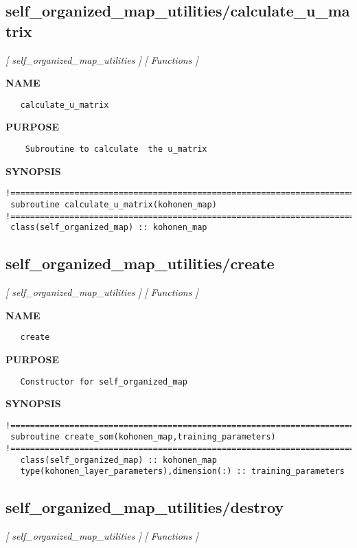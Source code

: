 \documentclass{article}
\begin{document}
\subsection{self\_organized\_map\_utilities/calculate\_u\_matrix}
\textsl{[ self\_organized\_map\_utilities ]}
\textsl{[ Functions ]}

\label{ch:robo39}
\label{ch:self_organized_map_utilities_calculate_u_matrix}
\textbf{NAME}
\begin{verbatim}
   calculate_u_matrix
\end{verbatim}
\textbf{PURPOSE}
\begin{verbatim}
    Subroutine to calculate  the u_matrix
\end{verbatim}
\textbf{SYNOPSIS}
\begin{verbatim}
!========================================================================================
 subroutine calculate_u_matrix(kohonen_map)
!========================================================================================
 class(self_organized_map) :: kohonen_map
\end{verbatim}
\newpage
\subsection{self\_organized\_map\_utilities/create}
\textsl{[ self\_organized\_map\_utilities ]}
\textsl{[ Functions ]}

\label{ch:robo40}
\label{ch:self_organized_map_utilities_create}
\textbf{NAME}
\begin{verbatim}
   create
\end{verbatim}
\textbf{PURPOSE}
\begin{verbatim}
   Constructor for self_organized_map 
\end{verbatim}
\textbf{SYNOPSIS}
\begin{verbatim}
!========================================================================================
 subroutine create_som(kohonen_map,training_parameters)
!========================================================================================
   class(self_organized_map) :: kohonen_map
   type(kohonen_layer_parameters),dimension(:) :: training_parameters
\end{verbatim}
\newpage
\subsection{self\_organized\_map\_utilities/destroy}
\textsl{[ self\_organized\_map\_utilities ]}
\textsl{[ Functions ]}
\end{document}
